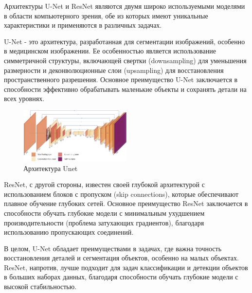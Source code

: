 Архитектуры U-Net и ResNet являются двумя широко используемыми моделями в области компьютерного зрения, обе из которых имеют уникальные характеристики и применяются в различных задачах.

U-Net - это архитектура, разработанная для сегментации изображений, особенно в медицинском изображении. Ее особенностью является использование симметричной структуры, включающей свертки (downsampling) для уменьшения размерности и деконволюционные слои (upsampling) для восстановления пространственного разрешения. Основное преимущество U-Net заключается в способности эффективно обрабатывать маленькие объекты и сохранять детали на всех уровнях.

\begin{figure}[h]
    \centering
    \includegraphics[width=0.5\textwidth]{assets/cv/unet.png}
    \caption{Архитектура Unet \cite{ronneberger2015u}}
    \label{sd_arch}
\end{figure}


ResNet, с другой стороны, известен своей глубокой архитектурой с использованием блоков с пропуском (skip connections), которые обеспечивают плавное обучение глубоких сетей. Основное преимущество ResNet заключается в способности обучать глубокие модели с минимальным ухудшением производительности (проблема затухающих градиентов), благодаря использованию пропускающих соединений.

В целом, U-Net обладает преимуществами в задачах, где важна точность восстановления деталей и сегментация объектов, особенно на малых объектах. ResNet, напротив, лучше подходит для задач классификации и детекции объектов в больших наборах данных, благодаря способности обучать глубокие модели с высокой стабильностью.


